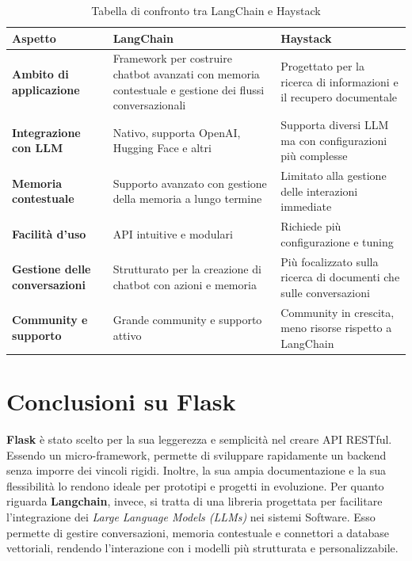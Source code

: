 \documentclass{article}
\begin{document}
\begin{table}[H]
    \renewcommand{\arraystretch}{1.7}
    \centering
    \begin{tabular}{|p{2.55cm}|p{5cm}|p{5cm}|}
    \hline
    \textbf{Aspetto} & \textbf{LangChain} & \textbf{Haystack} \\
    \hline
    \textbf{Ambito di applicazione} & Framework per costruire chatbot avanzati con memoria contestuale e gestione dei flussi conversazionali & Progettato per la ricerca di informazioni e il recupero documentale \\
    \hline
    \textbf{Integrazione con LLM} & Nativo, supporta OpenAI, Hugging Face e altri & Supporta diversi LLM ma con configurazioni più complesse \\
    \hline
    \textbf{Memoria contestuale} & Supporto avanzato con gestione della memoria a lungo termine & Limitato alla gestione delle interazioni immediate \\
    \hline
    \textbf{Facilità d'uso} & API intuitive e modulari & Richiede più configurazione e tuning \\
    \hline
    \textbf{Gestione delle conversazioni} & Strutturato per la creazione di chatbot con azioni e memoria & Più focalizzato sulla ricerca di documenti che sulle conversazioni \\
    \hline
    \textbf{Community e supporto} & Grande community e supporto attivo & Community in crescita, meno risorse rispetto a LangChain \\
    \hline
    \end{tabular}
    \caption{Tabella di confronto tra LangChain e Haystack}
\end{table}

\section{Conclusioni su Flask}
\textbf{Flask} è stato scelto per la sua leggerezza e semplicità nel creare 
API RESTful. Essendo un micro-framework, permette di sviluppare 
rapidamente un backend senza imporre dei vincoli rigidi. 
Inoltre, la sua ampia documentazione e la sua flessibilità lo rendono 
ideale per prototipi e progetti in evoluzione.
Per quanto riguarda \textbf{Langchain}, invece, si tratta di una libreria
progettata per facilitare l'integrazione dei \textit{Large Language Models (LLMs)}
nei sistemi Software. Esso permette di gestire conversazioni, memoria
contestuale e connettori a database vettoriali, rendendo l'interazione 
con i modelli più strutturata e personalizzabile.
\end{document}
